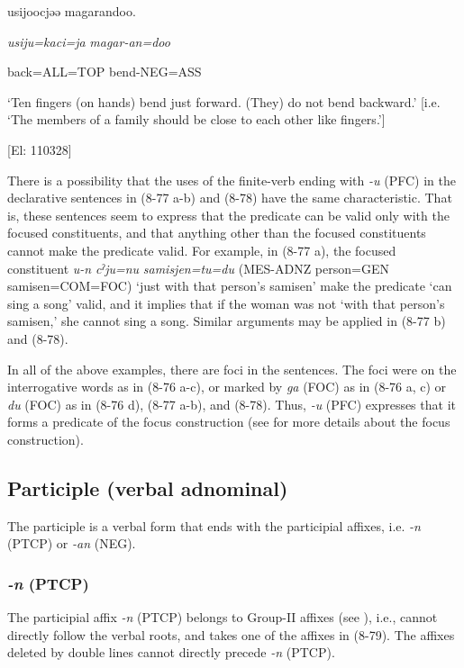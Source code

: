     usijoocjəə  magarandoo.

    \textit{usiju=kaci=ja}  \textit{magar-an=doo}

    back=ALL=TOP  bend-NEG=ASS

    ‘Ten fingers (on hands) bend just forward. (They) do not bend backward.’ [i.e. ‘The members of a family should be close to each other like fingers.’]

    [El: 110328]

There is a possibility that the uses of the finite-verb ending with \textit{{}-u} (PFC) in the declarative sentences in (8-77 a-b) and (8-78) have the same characteristic. That is, these sentences seem to express that the predicate can be valid only with the focused constituents, and that anything other than the focused constituents cannot make the predicate valid. For example, in (8-77 a), the focused constituent \textit{u-n} \textit{cˀju=nu} \textit{samisjen=tu=du} (MES-ADNZ person=GEN samisen=COM=FOC) ‘just with that person’s samisen’ make the predicate ‘can sing a song’ valid, and it implies that if the woman was not ‘with that person’s samisen,’ she cannot sing a song. Similar arguments may be applied in (8-77 b) and (8-78).

  In all of the above examples, there are foci in the sentences. The foci were on the interrogative words as in (8-76 a-c), or marked by \textit{ga} (FOC) as in (8-76 a, c) or \textit{du} (FOC) as in (8-76 d), (8-77 a-b), and (8-78). Thus, \textit{{}-u} (PFC) expresses that it forms a predicate of the focus construction (see  for more details about the focus construction).

\subsection{Participle (verbal adnominal)}

The participle is a verbal form that ends with the participial affixes, i.e. \textit{{}-n} (PTCP) or \textit{{}-an} (NEG).

\subsubsection{\textit{{}-n} (PTCP)}

The participial affix \textit{{}-n} (PTCP) belongs to Group-II affixes (see ), i.e., cannot directly follow the verbal roots, and takes one of the affixes in (8-79). The affixes deleted by double lines cannot directly precede \textit{{}-n} (PTCP).

